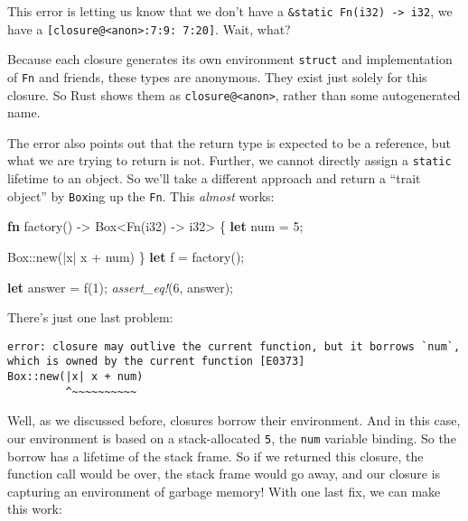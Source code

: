 \documentclass[a4paper,]{book}
\newenvironment{Shaded}{\begin{snugshade}}{\end{snugshade}}
\newcommand{\KeywordTok}[1]{\textcolor[rgb]{0.13,0.29,0.53}{\textbf{{#1}}}}
\newcommand{\DataTypeTok}[1]{\textcolor[rgb]{0.13,0.29,0.53}{{#1}}}
\newcommand{\DecValTok}[1]{\textcolor[rgb]{0.00,0.00,0.81}{{#1}}}
\newcommand{\BuiltInTok}[1]{{#1}}
\newcommand{\PreprocessorTok}[1]{\textcolor[rgb]{0.56,0.35,0.01}{\textit{{#1}}}}
\newcommand{\NormalTok}[1]{{#1}}
\begin{document}
This error is letting us know that we don't have a
\texttt{\&\textquotesingle{}static\ Fn(i32)\ -\textgreater{}\ i32}, we
have a \texttt{{[}closure@\textless{}anon\textgreater{}:7:9:\ 7:20{]}}.
Wait, what?

Because each closure generates its own environment \texttt{struct} and
implementation of \texttt{Fn} and friends, these types are anonymous.
They exist just solely for this closure. So Rust shows them as
\texttt{closure@\textless{}anon\textgreater{}}, rather than some
autogenerated name.

The error also points out that the return type is expected to be a
reference, but what we are trying to return is not. Further, we cannot
directly assign a \texttt{\textquotesingle{}static} lifetime to an
object. So we'll take a different approach and return a ``trait object''
by \texttt{Box}ing up the \texttt{Fn}. This \emph{almost} works:

\begin{Shaded}
\begin{Highlighting}[]
\KeywordTok{fn} \NormalTok{factory() -> }\DataTypeTok{Box}\NormalTok{<}\BuiltInTok{Fn}\NormalTok{(}\DataTypeTok{i32}\NormalTok{) -> }\DataTypeTok{i32}\NormalTok{> \{}
    \KeywordTok{let} \NormalTok{num = }\DecValTok{5}\NormalTok{;}

    \DataTypeTok{Box}\NormalTok{::new(|x| x + num)}
\NormalTok{\}}
\KeywordTok{let} \NormalTok{f = factory();}

\KeywordTok{let} \NormalTok{answer = f(}\DecValTok{1}\NormalTok{);}
\PreprocessorTok{assert_eq!}\NormalTok{(}\DecValTok{6}\NormalTok{, answer);}
\end{Highlighting}
\end{Shaded}

There's just one last problem:

\begin{verbatim}
error: closure may outlive the current function, but it borrows `num`,
which is owned by the current function [E0373]
Box::new(|x| x + num)
         ^~~~~~~~~~~
\end{verbatim}

Well, as we discussed before, closures borrow their environment. And in
this case, our environment is based on a stack-allocated \texttt{5}, the
\texttt{num} variable binding. So the borrow has a lifetime of the stack
frame. So if we returned this closure, the function call would be over,
the stack frame would go away, and our closure is capturing an
environment of garbage memory! With one last fix, we can make this work:
\end{document}
